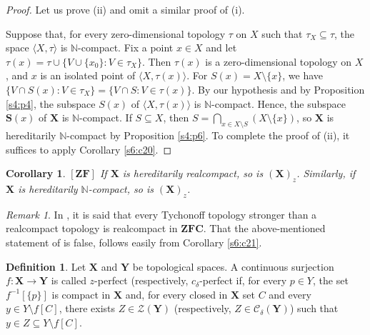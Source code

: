 \documentclass[12pt,twoside,leqno]{article}
\theoremstyle{plain}
\newtheorem{corollary}[theorem]{Corollary}
\theoremstyle{definition}
\newtheorem{definition}[theorem]{Definition}
\theoremstyle{remark}
\newtheorem{remark}[theorem]{Remark}
\begin{document}
\begin{proof}
	Let us prove (ii) and omit a similar proof of (i).
	
	Suppose that, for every zero-dimensional topology $\tau$ on $X$ such that $\tau_X\subseteq \tau$, the space $\langle X, \tau\rangle$ is $\mathbb{N}$-compact. Fix a point $x\in X$ and let $\tau(x)=\tau\cup\{V\cup\{x_0\}: V\in\tau_X\}$. Then $\tau(x)$ is a zero-dimensional topology on $X$, and $x$ is an isolated point of $\langle X, \tau(x)\rangle$. For $S(x)= X\setminus \{x\}$, we have $\{V\cap S(x): V\in\tau_X\}=\{V\cap S: V\in \tau(x)\}$. By our hypothesis and by Proposition \ref{s4:p4}, the subspace $S(x)$ of $\langle X, \tau(x)\rangle$ is $\mathbb{N}$-compact. Hence, the subspace $\mathbf{S}(x)$ of $\mathbf{X}$ is $\mathbb{N}$-compact. If $S\subseteq X$, then $S=\bigcap\limits_{x\in X\setminus S}(X\setminus \{x\})$, so $\mathbf{X}$ is hereditarily $\mathbb{N}$-compact by Proposition \ref{s4:p6}. To complete the proof of (ii), it suffices to apply Corollary \ref{s6:c20}.
\end{proof}

\begin{corollary}
	\label{s6:c22}
	$[\mathbf{ZF}]$ If $\mathbf{X}$ is hereditarily realcompact, so is $(\mathbf{X})_z$. Similarly, if $\mathbf{X}$ is hereditarily $\mathbb{N}$-compact, so is $(\mathbf{X})_z$.
\end{corollary}

\begin{remark}
	\label{s6:r23} 
	In \cite[Remark (iii), p.  234]{lr}, it is said that every  Tychonoff topology stronger than a realcompact topology is realcompact in $\mathbf{ZFC}$. That the above-mentioned statement of \cite[Remark (iii), p. 234]{lr} is false, follows easily from Corollary \ref{s6:c21}.
\end{remark}

\begin{definition}
	\label{s6:d24}
	Let $\mathbf{X}$ and $\mathbf{Y}$ be topological spaces. A continuous surjection $f: \mathbf{X}\to\mathbf{Y}$ is called $z$-perfect (respectively, $c_{\delta}$-perfect if, for every $p\in Y$, the set $f^{-1}[\{p\}]$ is compact in $\mathbf{X}$  and, for every closed in $\mathbf{X}$ set $C$ and every $y\in Y\setminus f[C]$, there exists $Z\in \mathcal{Z}(\mathbf{Y})$ (respectively, $Z\in\mathcal{C}_{\delta}(\mathbf{Y})$) such that $y\in Z\subseteq Y\setminus f[C]$.
\end{definition}
\end{document}
